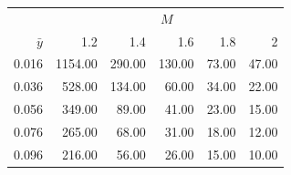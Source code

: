 \documentclass[aoas]{amsart}
\begin{document}
\begin{table}[ht]
\centering
\begin{tabular}{rrrrrr}
  & \multicolumn{5}{c}{$M$} \\ \cline{2-6}
$\bar y$ & 1.2 & 1.4 & 1.6 & 1.8 & 2 \\
  \hline
0.016 & 1154.00 & 290.00 & 130.00 & 73.00 & 47.00 \\
  0.036 & 528.00 & 134.00 & 60.00 & 34.00 & 22.00 \\
  0.056 & 349.00 & 89.00 & 41.00 & 23.00 & 15.00 \\
  0.076 & 265.00 & 68.00 & 31.00 & 18.00 & 12.00 \\
  0.096 & 216.00 & 56.00 & 26.00 & 15.00 & 10.00 \\
   \hline
\end{tabular}
\end{table}





\end{document}
